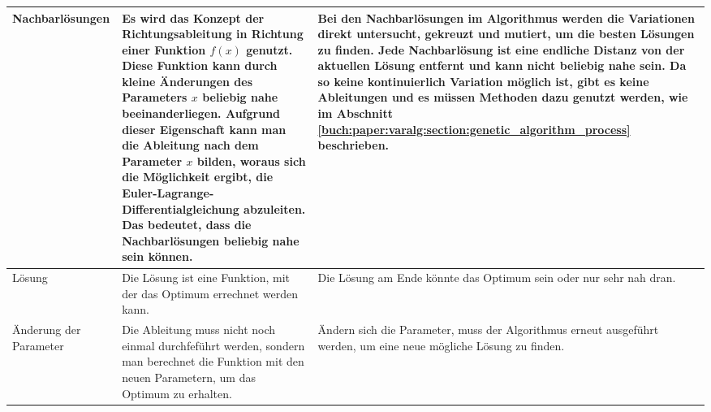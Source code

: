 \begin{table}
\begin{tabularx}{\textwidth}{|L|X|X|}
      Nachbarlösungen
       & Es wird das Konzept der Richtungsableitung in Richtung einer Funktion \(f(x)\)
       genutzt. Diese Funktion kann durch kleine Änderungen des Parameters \(x\) beliebig
       nahe beeinanderliegen. Aufgrund dieser Eigenschaft kann man die Ableitung nach dem
       Parameter \(x\) bilden, woraus sich die Möglichkeit ergibt, die Euler-Lagrange-Differentialgleichung
       abzuleiten. Das bedeutet, dass die Nachbarlösungen beliebig nahe sein können.  
       & Bei den Nachbarlösungen im Algorithmus werden die Variationen direkt untersucht,
      gekreuzt und mutiert, um die besten Lösungen zu finden. Jede Nachbarlösung 
      ist eine endliche Distanz von der aktuellen Lösung entfernt und kann nicht beliebig 
      nahe sein. Da so keine kontinuierlich Variation möglich ist, gibt es keine Ableitungen
      und es müssen Methoden dazu genutzt werden, wie im Abschnitt 
      \ref{buch:paper:varalg:section:genetic_algorithm_process} beschrieben.
      \\ \hline
      Lösung
       & Die Lösung ist eine Funktion, mit der das Optimum errechnet werden kann.
       & Die Lösung am Ende könnte das Optimum sein oder nur sehr nah dran.
      \\ \hline
      Änderung der Parameter
       & Die Ableitung muss nicht noch einmal durchfeführt werden, sondern man berechnet die 
       Funktion mit den neuen Parametern, um das Optimum zu erhalten.
       & Ändern sich die Parameter, muss der Algorithmus erneut ausgeführt werden, um eine
      neue mögliche Lösung zu finden.
      \\ \hline
   \end{tabularx}
   \label{tab:variation_comparison}
\end{table}

